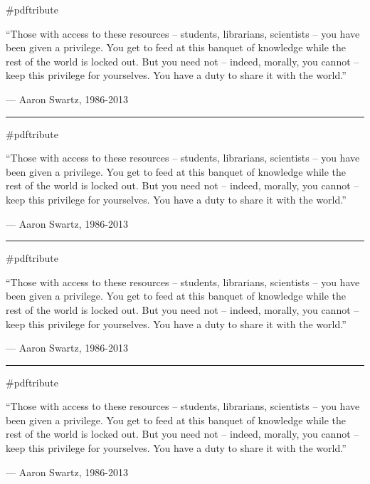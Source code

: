 \documentclass{article}
\begin{document}
\begin{center}
    {\Huge\#pdftribute}
\end{center}

{\Large``Those with access to these resources -- students, librarians,
scientists -- you have been given a privilege. You get to feed at this
banquet of knowledge while the rest of the world is locked out. But you need
not -- indeed, morally, you cannot -- keep this privilege for yourselves. You
have a duty to share it with the world.''

--- Aaron Swartz, 1986-2013}

\vspace{0.25in}
\rule{6in}{1px}
\vspace{0.1in}

\begin{center}
    {\Huge\#pdftribute}
\end{center}

{\Large``Those with access to these resources -- students, librarians,
scientists -- you have been given a privilege. You get to feed at this
banquet of knowledge while the rest of the world is locked out. But you need
not -- indeed, morally, you cannot -- keep this privilege for yourselves. You
have a duty to share it with the world.''

--- Aaron Swartz, 1986-2013}

\vspace{0.25in}
\rule{6in}{1px}
\vspace{0.1in}

\begin{center}
    {\Huge\#pdftribute}
\end{center}

{\Large``Those with access to these resources -- students, librarians,
scientists -- you have been given a privilege. You get to feed at this
banquet of knowledge while the rest of the world is locked out. But you need
not -- indeed, morally, you cannot -- keep this privilege for yourselves. You
have a duty to share it with the world.'' 

--- Aaron Swartz, 1986-2013}

\vspace{0.25in}
\rule{6in}{1px}
\vspace{0.1in}

\begin{center}
    {\Huge\#pdftribute}
\end{center}

{\Large``Those with access to these resources -- students, librarians,
scientists -- you have been given a privilege. You get to feed at this
banquet of knowledge while the rest of the world is locked out. But you need
not -- indeed, morally, you cannot -- keep this privilege for yourselves. You
have a duty to share it with the world.'' 

--- Aaron Swartz, 1986-2013}
\end{document}
